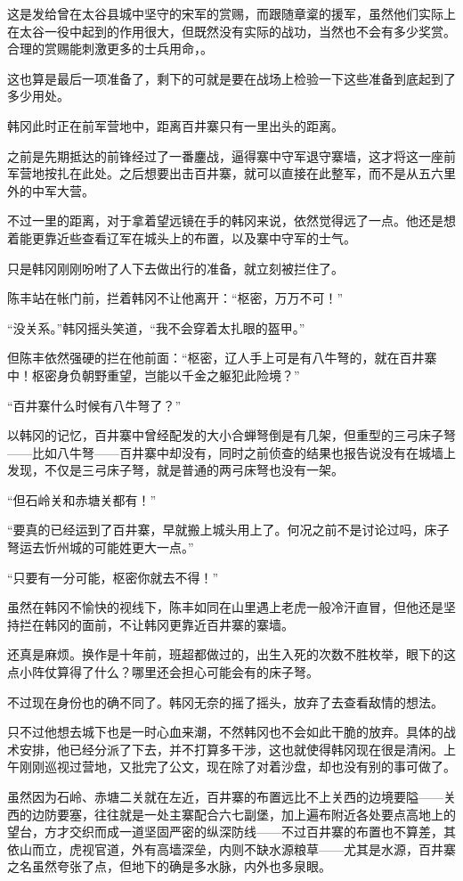 这是发给曾在太谷县城中坚守的宋军的赏赐，而跟随章楶的援军，虽然他们实际上在太谷一役中起到的作用很大，但既然没有实际的战功，当然也不会有多少奖赏。合理的赏赐能刺激更多的士兵用命，。

这也算是最后一项准备了，剩下的可就是要在战场上检验一下这些准备到底起到了多少用处。

韩冈此时正在前军营地中，距离百井寨只有一里出头的距离。

之前是先期抵达的前锋经过了一番鏖战，逼得寨中守军退守寨墙，这才将这一座前军营地按扎在此处。之后想要出击百井寨，就可以直接在此整军，而不是从五六里外的中军大营。

不过一里的距离，对于拿着望远镜在手的韩冈来说，依然觉得远了一点。他还是想着能更靠近些查看辽军在城头上的布置，以及寨中守军的士气。

只是韩冈刚刚吩咐了人下去做出行的准备，就立刻被拦住了。

陈丰站在帐门前，拦着韩冈不让他离开：“枢密，万万不可！”

“没关系。”韩冈摇头笑道，“我不会穿着太扎眼的盔甲。”

但陈丰依然强硬的拦在他前面：“枢密，辽人手上可是有八牛弩的，就在百井寨中！枢密身负朝野重望，岂能以千金之躯犯此险境？”

“百井寨什么时候有八牛弩了？”

以韩冈的记忆，百井寨中曾经配发的大小合蝉弩倒是有几架，但重型的三弓床子弩——比如八牛弩——百井寨中却没有，同时之前侦查的结果也报告说没有在城墙上发现，不仅是三弓床子弩，就是普通的两弓床弩也没有一架。

“但石岭关和赤塘关都有！”

“要真的已经运到了百井寨，早就搬上城头用上了。何况之前不是讨论过吗，床子弩运去忻州城的可能姓更大一点。”

“只要有一分可能，枢密你就去不得！”

虽然在韩冈不愉快的视线下，陈丰如同在山里遇上老虎一般冷汗直冒，但他还是坚持拦在韩冈的面前，不让韩冈更靠近百井寨的寨墙。

还真是麻烦。换作是十年前，班超都做过的，出生入死的次数不胜枚举，眼下的这点小阵仗算得了什么？哪里还会担心可能会有的床子弩。

不过现在身份也的确不同了。韩冈无奈的摇了摇头，放弃了去查看敌情的想法。

只不过他想去城下也是一时心血来潮，不然韩冈也不会如此干脆的放弃。具体的战术安排，他已经分派了下去，并不打算多干涉，这也就使得韩冈现在很是清闲。上午刚刚巡视过营地，又批完了公文，现在除了对着沙盘，却也没有别的事可做了。

虽然因为石岭、赤塘二关就在左近，百井寨的布置远比不上关西的边境要隘——关西的边防要塞，往往就是一处主寨配合六七副堡，加上遍布附近各处要点高地上的望台，方才交织而成一道坚固严密的纵深防线——不过百井寨的布置也不算差，其依山而立，虎视官道，外有高墙深垒，内则不缺水源粮草——尤其是水源，百井寨之名虽然夸张了点，但地下的确是多水脉，内外也多泉眼。

